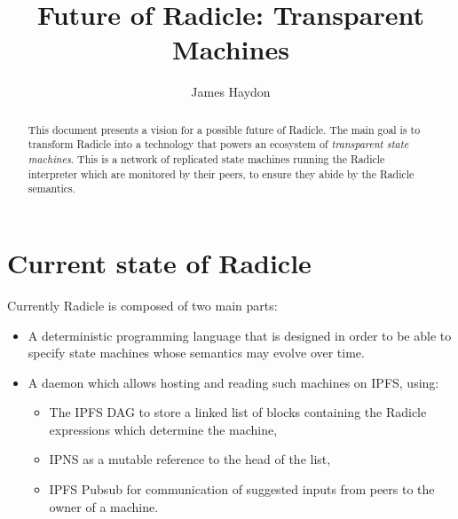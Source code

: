 \documentclass[a4paper, oneside, 10pt]{amsart}
\begin{document}
\title{Future of Radicle: Transparent Machines}
\date{}
\author{James Haydon}

\begin{abstract}
This document presents a vision for a possible future of Radicle. The main goal
is to transform Radicle into a technology that powers an ecosystem of
\emph{transparent state machines}. This is a network of replicated state
machines running the Radicle interpreter which are monitored by their peers, to
ensure they abide by the Radicle semantics.
\end{abstract}

\maketitle

\tableofcontents

\section{Current state of Radicle}

Currently Radicle is composed of two main parts:
\begin{itemize}
\item
  A deterministic programming language that is designed in order to be able to
  specify state machines whose semantics may evolve over time.
\item
  A daemon which allows hosting and reading such machines on IPFS, using:
  \begin{itemize}
  \item
    The IPFS DAG to store a linked list of blocks containing the Radicle
    expressions which determine the machine,
  \item
    IPNS as a mutable reference to the head of the list,
  \item
    IPFS Pubsub for communication of suggested inputs from peers to the owner of
    a machine.
  \end{itemize}
\end{itemize}
\end{document}
